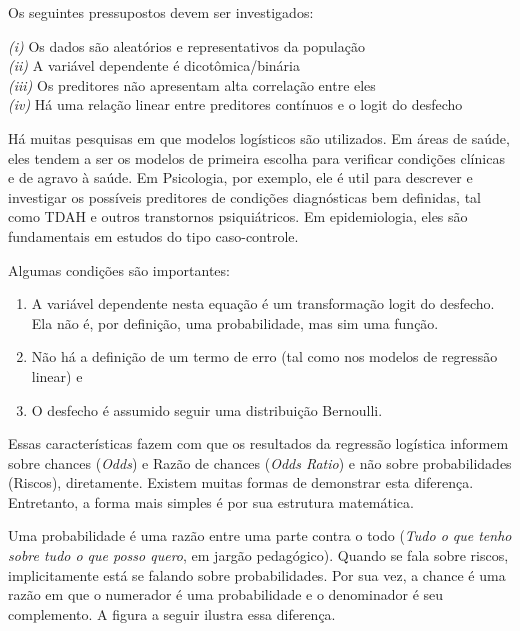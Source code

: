 \documentclass[
]{book}
\providecommand{\tightlist}{%
  \setlength{\itemsep}{0pt}\setlength{\parskip}{0pt}}
\begin{document}
Os seguintes pressupostos devem ser investigados:

\emph{(i)} Os dados são aleatórios e representativos da população\\
\emph{(ii)} A variável dependente é dicotômica/binária\\
\emph{(iii)} Os preditores não apresentam alta correlação entre eles\\
\emph{(iv)} Há uma relação linear entre preditores contínuos e o logit
do desfecho

Há muitas pesquisas em que modelos logísticos são utilizados. Em áreas
de saúde, eles tendem a ser os modelos de primeira escolha para
verificar condições clínicas e de agravo à saúde. Em Psicologia, por
exemplo, ele é util para descrever e investigar os possíveis preditores
de condições diagnósticas bem definidas, tal como TDAH e outros
transtornos psiquiátricos. Em epidemiologia, eles são fundamentais em
estudos do tipo caso-controle.

Algumas condições são importantes:

\begin{enumerate}
\def\labelenumi{(\arabic{enumi})}
\tightlist
\item
  A variável dependente nesta equação é um transformação logit do
  desfecho. Ela não é, por definição, uma probabilidade, mas sim uma
  função.\\
\item
  Não há a definição de um termo de erro (tal como nos modelos de
  regressão linear) e\\
\item
  O desfecho é assumido seguir uma distribuição Bernoulli.
\end{enumerate}

Essas características fazem com que os resultados da regressão logística
informem sobre chances (\emph{Odds}) e Razão de chances (\emph{Odds
Ratio}) e não sobre probabilidades (Riscos), diretamente. Existem muitas
formas de demonstrar esta diferença. Entretanto, a forma mais simples é
por sua estrutura matemática.

Uma probabilidade é uma razão entre uma parte contra o todo (\emph{Tudo
o que tenho sobre tudo o que posso quero}, em jargão pedagógico). Quando
se fala sobre riscos, implicitamente está se falando sobre
probabilidades. Por sua vez, a chance é uma razão em que o numerador é
uma probabilidade e o denominador é seu complemento. A figura a seguir
ilustra essa diferença.
\end{document}

